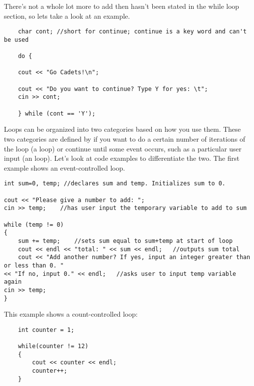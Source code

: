 There's not a whole lot more to add then hasn't been stated in the while loop section, so lets take a look at an example.

\begin{lstlisting}
    char cont; //short for continue; continue is a key word and can't be used

    do {

    cout << "Go Cadets!\n";

    cout << "Do you want to continue? Type Y for yes: \t";
    cin >> cont;

    } while (cont == 'Y');
\end{lstlisting}


Loops can be organized into two categories based on how you use them.
These two categories are defined by if you want to do a certain number of iterations of the loop (a  loop) or continue until some event occurs, such as a particular user input (an  loop).
Let's look at code examples to differentiate the two. The first example shows an event-controlled  loop.

\noindent\begin{minipage}{\linewidth}\begin{lstlisting}
int sum=0, temp; //declares sum and temp. Initializes sum to 0.

cout << "Please give a number to add: ";
cin >> temp;	//has user input the temporary variable to add to sum

while (temp != 0) 
{
	sum += temp;	//sets sum equal to sum+temp at start of loop
	cout << endl << "total: " << sum << endl;	//outputs sum total
	cout << "Add another number? If yes, input an integer greater than or less than 0. "
<< "If no, input 0." << endl;	//asks user to input temp variable again
cin >> temp;
}
\end{lstlisting}\end{minipage}

\noindent This example shows a count-controlled  loop:

\begin{lstlisting}
    int counter = 1;

    while(counter != 12)
    {
        cout << counter << endl;
        counter++;
    }
\end{lstlisting}


